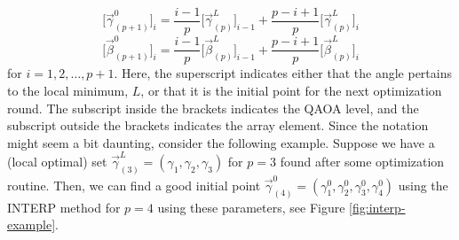 \begin{equation}
\Big[\vec{\gamma}_{(p+1)}^0\Big]_i = \frac{i-1}{p}\Big[\vec{\gamma}_{(p)}^L\Big]_{i-1} + \frac{p-i+1}{p}\Big[\vec{\gamma}_{(p)}^L\Big]_i
\end{equation}
\begin{equation}
\Big[\vec{\beta}_{(p+1)}^0\big]_i = \frac{i-1}{p}\Big[\vec{\beta}_{(p)}^L\Big]_{i-1} + \frac{p-i+1}{p}\Big[\vec{\beta}_{(p)}^L\Big]_i
\end{equation}
for $i = 1, 2, \dots, p+1$. Here, the superscript indicates either that the angle pertains to the local minimum, $L$, or that it is the initial point for the next optimization round. The subscript inside the brackets indicates the QAOA level, and the subscript outside the brackets indicates the array element. Since the notation might seem a bit daunting, consider the following example. Suppose we have a (local optimal) set $\vec{\gamma}^L_{(3)} = (\gamma_1, \gamma_2,\gamma_3)$ for $p=3$ found after some optimization routine. Then, we can find a good initial point $\vec{\gamma}^0_{(4)} = (\gamma_1^0, \gamma_2^0,\gamma_3^0, \gamma_4^0)$ using the INTERP method for $p=4$ using these parameters, see Figure \ref{fig:interp-example}.
